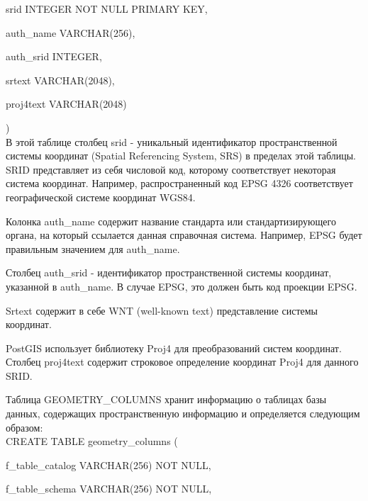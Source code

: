 \documentclass[12pt,a4paper,oneside]{article} %
\begin{document}
	srid       INTEGER NOT NULL PRIMARY KEY,

	auth\_name  VARCHAR(256),

	auth\_srid  INTEGER,

	srtext     VARCHAR(2048),

	proj4text  VARCHAR(2048)

)
\\[10pt]
В этой таблице столбец srid - уникальный идентификатор \linebreak
пространственной системы координат (Spatial Referencing System, SRS) \linebreak
в пределах этой таблицы. SRID представляет из себя числовой код, \linebreak
которому соответствует некоторая система координат. Например, \linebreak
распространенный код EPSG 4326 соответствует географической системе координат WGS84.

Колонка auth\_name содержит название стандарта или \linebreak
стандартизирующего органа, на который ссылается данная справочная \linebreak
система. Например, EPSG будет правильным значением для auth\_name.

Столбец auth\_srid - идентификатор пространственной системы \linebreak
координат, указанной в auth\_name. В случае EPSG, это должен \linebreak
быть код проекции EPSG.

Srtext содержит в себе WNT (well-known text) представление системы \linebreak
координат.

PostGIS использует библиотеку Proj4 для преобразований систем \linebreak
координат. Столбец proj4text содержит строковое определение \linebreak
координат Proj4 для данного SRID.

Таблица GEOMETRY\_COLUMNS хранит информацию о таблицах базы \linebreak
данных, содержащих пространственную информацию и определяется \linebreak
следующим образом:
\\[10pt]
CREATE TABLE geometry\_columns (

	f\_table\_catalog    VARCHAR(256) NOT NULL,

	f\_table\_schema     VARCHAR(256) NOT NULL,
\end{document}
